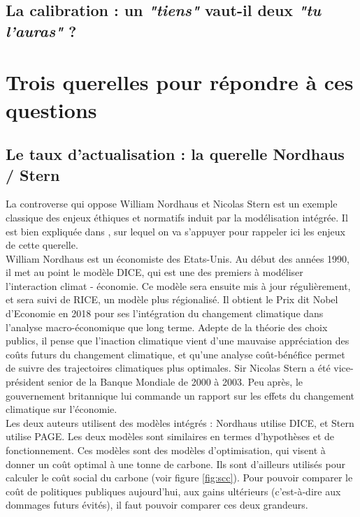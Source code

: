 \subsection{La calibration : un \textit{"tiens"} vaut-il deux \textit{"tu l'auras"} ?}

\section{Trois querelles pour répondre à ces questions}

\subsection{Le taux d'actualisation : la querelle Nordhaus / Stern}

La controverse qui oppose William Nordhaus et Nicolas Stern est un exemple classique des enjeux éthiques et normatifs induit par la modélisation intégrée. Il est bien expliquée dans \cite{guigourez_10_2023}, sur lequel on va s'appuyer pour rappeler ici les enjeux de cette querelle. \\

William Nordhaus est un économiste des Etats-Unis. Au début des années 1990, il met au point le modèle DICE, qui est une des premiers à modéliser l'interaction climat - économie. Ce modèle sera ensuite mis à jour régulièrement, et sera suivi de RICE, un modèle plus régionalisé. Il obtient le Prix dit Nobel d'Economie en 2018 pour ses l'intégration du changement climatique dans l'analyse macro-économique que long terme\cite{yale}. Adepte de la théorie des choix publics, il pense que l'inaction climatique vient d'une mauvaise appréciation des coûts futurs du changement climatique, et qu'une analyse coût-bénéfice permet de suivre des trajectoires climatiques plus optimales. 
Sir Nicolas Stern a été vice-président senior de la Banque Mondiale de 2000 à 2003. Peu après, le gouvernement britannique lui commande un rapport sur les effets du changement climatique sur l'économie. \\

Les deux auteurs utilisent des modèles intégrés : Nordhaus utilise DICE, et Stern utilise PAGE. Les deux modèles sont similaires en termes d'hypothèses et de fonctionnement. Ces modèles sont des modèles d'optimisation, qui visent à donner un coût optimal à une tonne de carbone. Ils sont d'ailleurs utilisés pour calculer le coût social du carbone (voir figure \ref{fig:scc}). Pour pouvoir comparer le coût de politiques publiques aujourd'hui, aux gains ultérieurs (c'est-à-dire aux dommages futurs évités), il faut pouvoir comparer ces deux grandeurs. \\

